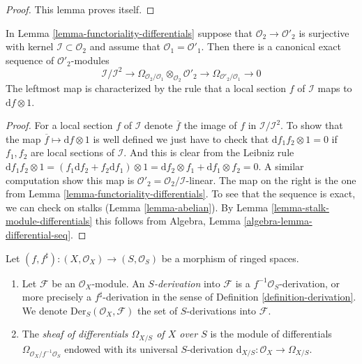 \begin{proof}
This lemma proves itself.
\end{proof}

\begin{lemma}
\label{lemma-differential-seq}
In Lemma \ref{lemma-functoriality-differentials} suppose that
$\mathcal{O}_2 \to \mathcal{O}'_2$ is surjective with kernel
$\mathcal{I} \subset \mathcal{O}_2$ and assume that
$\mathcal{O}_1 = \mathcal{O}'_1$. Then there is a canonical exact
sequence of $\mathcal{O}'_2$-modules
$$
\mathcal{I}/\mathcal{I}^2
\longrightarrow
\Omega_{\mathcal{O}_2/\mathcal{O}_1} \otimes_{\mathcal{O}_2} \mathcal{O}'_2
\longrightarrow
\Omega_{\mathcal{O}'_2/\mathcal{O}_1}
\longrightarrow
0
$$
The leftmost map is characterized by the rule that a local section
$f$ of $\mathcal{I}$ maps to $\text{d}f \otimes 1$.
\end{lemma}

\begin{proof}
For a local section $f$ of $\mathcal{I}$ denote $\overline{f}$ the image of
$f$ in $\mathcal{I}/\mathcal{I}^2$. To show that the map
$\overline{f} \mapsto \text{d}f \otimes 1$ is well defined we just have to
check that $\text{d} f_1f_2 \otimes 1 = 0$ if $f_1, f_2$ are local sections
of $\mathcal{I}$. And this is clear from the Leibniz rule
$\text{d} f_1f_2 \otimes 1 =
(f_1 \text{d}f_2 + f_2 \text{d} f_1 )\otimes 1 =
\text{d}f_2 \otimes f_1 + \text{d}f_1 \otimes f_2 = 0$.
A similar computation show this map is
$\mathcal{O}'_2 = \mathcal{O}_2/\mathcal{I}$-linear. The map on the right
is the one from Lemma \ref{lemma-functoriality-differentials}. To see
that the sequence is exact, we can check on stalks
(Lemma \ref{lemma-abelian}). By
Lemma \ref{lemma-stalk-module-differentials}
this follows from
Algebra, Lemma \ref{algebra-lemma-differential-seq}.
\end{proof}

\begin{definition}
\label{definition-differentials}
Let $(f, f^\sharp) : (X, \mathcal{O}_X) \to (S, \mathcal{O}_S)$
be a morphism of ringed spaces.
\begin{enumerate}
\item Let $\mathcal{F}$ be an $\mathcal{O}_X$-module. An {\it $S$-derivation}
into $\mathcal{F}$ is a $f^{-1}\mathcal{O}_S$-derivation, or more
precisely a $f^\sharp$-derivation in the sense of
Definition \ref{definition-derivation}.
We denote $\text{Der}_S(\mathcal{O}_X, \mathcal{F})$
the set of $S$-derivations into $\mathcal{F}$.
\item The {\it sheaf of differentials $\Omega_{X/S}$ of $X$ over $S$}
is the module of differentials $\Omega_{\mathcal{O}_X/f^{-1}\mathcal{O}_S}$
endowed with its universal
$S$-derivation $\text{d}_{X/S} : \mathcal{O}_X \to \Omega_{X/S}$.
\end{enumerate}
\end{definition}

